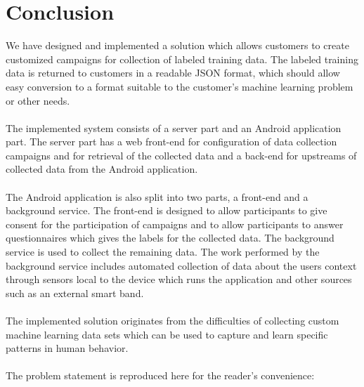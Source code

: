 
\chapter{Conclusion}
\label{cha:conclusion}

We have designed and implemented a solution which allows customers to create customized campaigns for collection of labeled training data. The labeled training data is returned to customers in a readable JSON format, which should allow easy conversion to a format suitable to the customer's machine learning problem or other needs. 
\\\\
The implemented system consists of a server part and an Android application part. The server part has a web front-end for configuration of data collection campaigns and for retrieval of the collected data and a back-end for upstreams of collected data from the Android application. 
\\\\
The Android application is also split into two parts, a front-end and a background service. The front-end is designed to allow participants to give consent for the participation of campaigns and to allow participants to answer questionnaires which gives the labels for the collected data. The background service is used to collect the remaining data. The work performed by the background service includes automated collection of data about the users context through sensors local to the device which runs the application and other sources such as an external smart band. 
\\\\
The implemented solution originates from the difficulties of collecting custom machine learning data sets which can be used to capture and learn specific patterns in human behavior.  
\\\\
The problem statement is reproduced here for the reader's convenience:
\\



